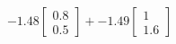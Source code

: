 \documentclass[preview]{standalone}
\begin{document}
\begin{align*}
-1.48 \begin{bmatrix} 0.8 \\ 0.5 \end{bmatrix} + -1.49 \begin{bmatrix} 1 \\ 1.6 \end{bmatrix}
\end{align*}
\end{document}
